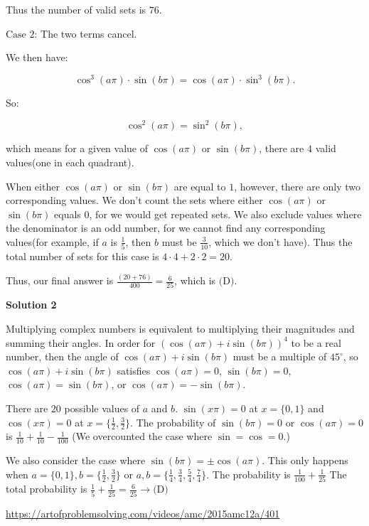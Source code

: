\begin{enumerate}
 Thus the number of valid sets is $76$.

 $\text{Case~2}$: The two terms cancel. 

 We then have: 

 
 \[\cos^3(a\pi) \cdot \sin(b\pi) = \cos(a\pi) \cdot \sin^3(b\pi).\]

 So: 

 
 \[\cos^2(a\pi) = \sin^2(b\pi),\]

 which means for a given value of $\cos(a\pi)$ or $\sin(b\pi)$, there are $4$ valid values(one in each quadrant).

 When either $\cos(a\pi)$ or $\sin(b\pi)$ are equal to $1$, however, there are only two corresponding values. We don't count the sets where either $\cos(a\pi)$ or $\sin(b\pi)$ equals $0$, for we would get repeated sets. We also exclude values where the denominator is an odd number, for we cannot find any corresponding values(for example, if $a$ is $\frac{1}{5}$, then $b$ must be $\frac{3}{10}$, which we don't have). Thus the total number of sets for this case is $4 \cdot 4 + 2 \cdot 2 = 20$.

 Thus, our final answer is $\frac{(20 + 76)}{400} = \frac{6}{25}$, which is $\boxed{\text{(D)}}$.

 



\textbf{Solution 2}

Multiplying complex numbers is equivalent to multiplying their magnitudes and summing their angles. In order for $(\cos(a\pi)+i\sin(b\pi))^4$ to be a real number, then the angle of $\cos(a\pi)+i\sin(b\pi)$ must be a multiple of $45^{\circ}$, so $\cos(a\pi)+i\sin(b\pi)$ satisfies $\cos(a\pi)=0$, $\sin(b\pi)=0$, $\cos(a\pi)=\sin(b\pi)$, or $\cos(a\pi)=-\sin(b\pi)$. 

 There are $20$ possible values of $a$ and $b$. $\sin(x\pi) = 0$ at $x = \{0,1\}$ and $\cos(x\pi) = 0$ at $x = \{\frac12, \frac32\}$. The probability of $\sin(b\pi) = 0$ or $\cos(a\pi) = 0$ is $\frac{1}{10} + \frac{1}{10} - \frac{1}{100}$ (We overcounted the case where $\sin = \cos = 0$.)

 We also consider the case where $\sin(b\pi) = \pm \cos(a\pi)$. This only happens when $a = \{0,1\}, b = \{\frac12, \frac32\}$ or $a,b = \{ \frac14, \frac34, \frac54, \frac74 \}$. The probability is $\frac{1}{100} + \frac{1}{25}$ The total probability is $\frac15 + \frac{1}{25} = \frac{6}{25} \rightarrow\boxed{\text{(D)}}$

 \href{https://artofproblemsolving.com/videos/amc/2015amc12a/401}{https://artofproblemsolving.com/videos/amc/2015amc12a/401}


\end{enumerate}
